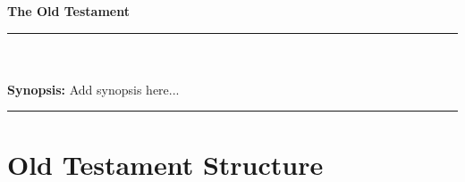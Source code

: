 \newpage
\thispagestyle{empty}

\begin{center}
\vspace{5cm}
\Huge \textbf{The Old Testament}
\end{center}

\rule{\textwidth}{0.5pt}\\  %
\vspace{-.4em} \\
\small \textbf{Synopsis:} Add synopsis here... \\
\rule{\textwidth}{0.5pt}    %

\section*{Old Testament Structure}

